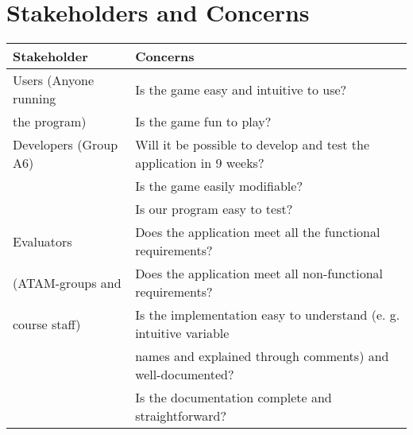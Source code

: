 \chapter{Stakeholders and Concerns}



  \begin{tabular}{ | l | l | }
    \hline
    Stakeholder & Concerns  \\ \hline
    Users (Anyone running &Is the game easy and intuitive to use? \\
    the program)&  Is the game fun to play? \\ \hline

    Developers (Group A6) & Will it be possible to develop and test the application in 9 weeks? \\ 
    & Is the game easily modifiable? \\
    & Is our program easy to test? \\ \hline

    Evaluators & Does the application meet all the functional requirements? \\
    (ATAM-groups and & Does the application meet all non-functional requirements? \\
    course staff) & Is the implementation easy to understand (e. g. intuitive variable \\
    & names and explained through comments) and well-documented? \\
    & Is the documentation complete and straightforward? \\ \hline

  \end{tabular}
